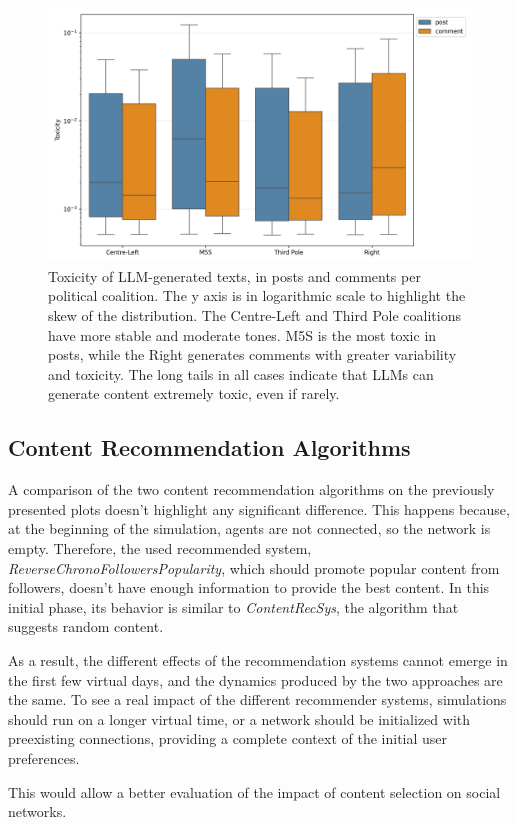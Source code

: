 \begin{figure}[h]
    \centering
    \includegraphics[width=0.6\linewidth]{Images/Toxicity/box_posts_vs_comments.png}
    \caption{
    Toxicity of LLM-generated texts, in posts and comments per political coalition.
    The y axis is in logarithmic scale to highlight the skew of the distribution.
    The Centre-Left and Third Pole coalitions have more stable and moderate tones.
    M5S is the most toxic in posts, while the Right generates comments with greater variability and toxicity.
    The long tails in all cases indicate that LLMs can generate content extremely toxic, even if rarely.
    }
    \label{fig:toxicity_box}
\end{figure}


\subsection{Content Recommendation Algorithms}
A comparison of the two content recommendation algorithms on the previously presented plots doesn't highlight any significant difference.
This happens because, at the beginning of the simulation, agents are not connected, so the network is empty.
Therefore, the used recommended system, \textit{ReverseChronoFollowersPopularity}, which should promote popular content from followers, doesn't have enough information to provide the best content.
In this initial phase, its behavior is similar to \textit{ContentRecSys}, the algorithm that suggests random content.

As a result, the different effects of the recommendation systems cannot emerge in the first few virtual days, and the dynamics produced by the two approaches are the same.
To see a real impact of the different recommender systems, simulations should run on a longer virtual time, or a network should be initialized with preexisting connections, providing a complete context of the initial user preferences.

This would allow a better evaluation of the impact of content selection on social networks.